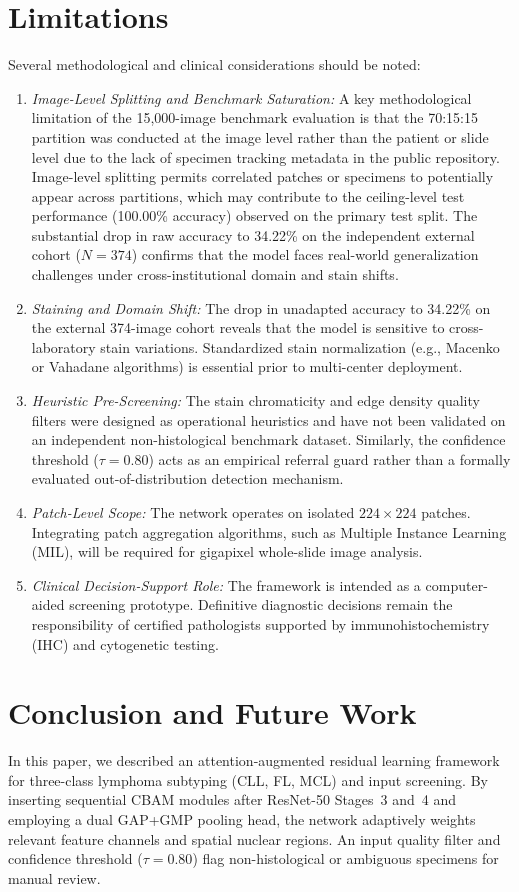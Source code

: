 \documentclass[conference]{IEEEtran}
\begin{document}
\section{Limitations}
\label{sec:limitations}
Several methodological and clinical considerations should be noted:
\begin{enumerate}
    \item \textit{Image-Level Splitting and Benchmark Saturation:} A key methodological limitation of the 15,000-image benchmark evaluation is that the 70:15:15 partition was conducted at the image level rather than the patient or slide level due to the lack of specimen tracking metadata in the public repository. Image-level splitting permits correlated patches or specimens to potentially appear across partitions, which may contribute to the ceiling-level test performance (100.00\% accuracy) observed on the primary test split. The substantial drop in raw accuracy to 34.22\% on the independent external cohort ($N=374$) confirms that the model faces real-world generalization challenges under cross-institutional domain and stain shifts.
    \item \textit{Staining and Domain Shift:} The drop in unadapted accuracy to 34.22\% on the external 374-image cohort reveals that the model is sensitive to cross-laboratory stain variations. Standardized stain normalization (e.g., Macenko or Vahadane algorithms) is essential prior to multi-center deployment.
    \item \textit{Heuristic Pre-Screening:} The stain chromaticity and edge density quality filters were designed as operational heuristics and have not been validated on an independent non-histological benchmark dataset. Similarly, the confidence threshold ($\tau = 0.80$) acts as an empirical referral guard rather than a formally evaluated out-of-distribution detection mechanism.
    \item \textit{Patch-Level Scope:} The network operates on isolated $224 \times 224$ patches. Integrating patch aggregation algorithms, such as Multiple Instance Learning (MIL), will be required for gigapixel whole-slide image analysis.
    \item \textit{Clinical Decision-Support Role:} The framework is intended as a computer-aided screening prototype. Definitive diagnostic decisions remain the responsibility of certified pathologists supported by immunohistochemistry (IHC) and cytogenetic testing.
\end{enumerate}

\section{Conclusion and Future Work}
\label{sec:conclusion}
In this paper, we described an attention-augmented residual learning framework for three-class lymphoma subtyping (CLL, FL, MCL) and input screening. By inserting sequential CBAM modules after ResNet-50 Stages~3 and~4 and employing a dual GAP+GMP pooling head, the network adaptively weights relevant feature channels and spatial nuclear regions. An input quality filter and confidence threshold ($\tau = 0.80$) flag non-histological or ambiguous specimens for manual review.
\end{document}
